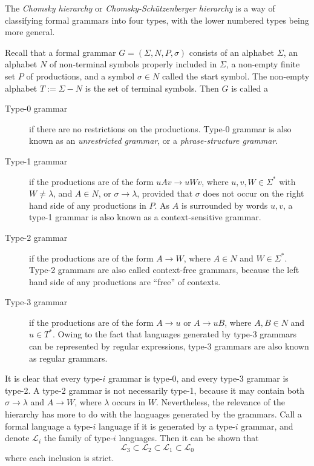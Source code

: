 \documentclass[12pt]{article}
\begin{document}
The {\em Chomsky hierarchy} or {\em Chomsky-Sch\"utzenberger hierarchy} is a way of classifying formal grammars into four types, with the lower numbered types being more general.

Recall that a formal grammar $G=(\Sigma,N,P,\sigma)$ consists of an alphabet $\Sigma$, an alphabet $N$ of non-terminal symbols properly included in $\Sigma$, a non-empty finite set $P$ of productions, and a symbol $\sigma\in N$ called the start symbol.  The non-empty alphabet $T:=\Sigma-N$ is the set of terminal symbols.  Then $G$ is called a
\begin{description}
\item[Type-0 grammar] if there are no restrictions on the productions.  Type-0 grammar is also known as an \emph{unrestricted grammar}, or a \emph{phrase-structure grammar}.
\item[Type-1 grammar] if the productions are of the form $uAv \to uWv$, where $u,v,W\in \Sigma^*$ with $W\ne \lambda$, and $A\in N$, or $\sigma\to \lambda$, provided that $\sigma$ does not occur on the right hand side of any productions in $P$.  As $A$ is surrounded by words $u,v$, a type-1 grammar is also known as a context-sensitive grammar.
\item[Type-2 grammar] if the productions are of the form $A\to W$, where $A\in N$ and $W\in \Sigma^*$.  Type-2 grammars are also called context-free grammars, because the left hand side of any productions are ``free'' of contexts.
\item[Type-3 grammar] if the productions are of the form $A\to u$ or $A\to uB$, where $A,B\in N$ and $u\in T^*$.  Owing to the fact that languages generated by type-3 grammars can be represented by regular expressions, type-3 grammars are also known as regular grammars.
\end{description}
It is clear that every type-$i$ grammar is type-0, and every type-3 grammar is type-2.  A type-2 grammar is not necessarily type-1, because it may contain both $\sigma\to \lambda$ and $A\to W$, where $\lambda$ occurs in $W$.  Nevertheless, the relevance of the hierarchy has more to do with the languages generated by the grammars.  Call a formal language a type-$i$ language if it is generated by a type-$i$ grammar, and denote $\mathscr{L}_i$ the family of type-$i$ languages.  Then it can be shown that
$$\mathscr{L}_3 \subset \mathscr{L}_2 \subset \mathscr{L}_1 \subset \mathscr{L}_0$$
where each inclusion is strict.
\end{document}
